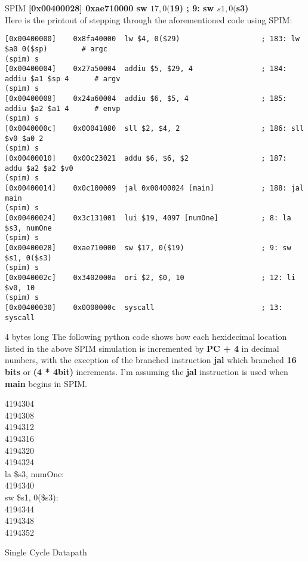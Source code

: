\documentclass[landscape,fontscale=1,margin=0.2cm,paperwidth=50truecm, paperheight=34truecm,debug]{baposter}
\begin{document}
\begin{poster}
\begin{posterbox}[column=1,textborder=rounded]{SPIM}
\textbf{[0x00400028]	0xae710000  sw $17, 0($19)                  ; 9: sw $s1, 0($s3)}\\
Here is the printout of stepping through the aforementioned code using SPIM:\\
\begin{lstlisting}
[0x00400000]	0x8fa40000  lw $4, 0($29)                   ; 183: lw $a0 0($sp)		# argc
(spim) s
[0x00400004]	0x27a50004  addiu $5, $29, 4                ; 184: addiu $a1 $sp 4		# argv
(spim) s
[0x00400008]	0x24a60004  addiu $6, $5, 4                 ; 185: addiu $a2 $a1 4		# envp
(spim) s
[0x0040000c]	0x00041080  sll $2, $4, 2                   ; 186: sll $v0 $a0 2
(spim) s
[0x00400010]	0x00c23021  addu $6, $6, $2                 ; 187: addu $a2 $a2 $v0
(spim) s
[0x00400014]	0x0c100009  jal 0x00400024 [main]           ; 188: jal main
(spim) s
[0x00400024]	0x3c131001  lui $19, 4097 [numOne]          ; 8: la $s3, numOne
(spim) s
[0x00400028]	0xae710000  sw $17, 0($19)                  ; 9: sw $s1, 0($s3) 
(spim) s
[0x0040002c]	0x3402000a  ori $2, $0, 10                  ; 12: li $v0, 10
(spim) s
[0x00400030]	0x0000000c  syscall                         ; 13: syscall
\end{lstlisting}
\end{posterbox}
\begin{posterbox}[column=1,below=auto]{4 bytes long}
The following python code shows how each hexidecimal location listed in the above SPIM simulation is incremented by \textbf{PC + 4} in decimal numbers, with the exception of the branched instruction \textbf{jal} which branched \textbf{16 bits} or \textbf{(4 * 4bit)} increments. I'm assuming the \textbf{jal} instruction is used when \textbf{main} begins in SPIM.  
\lstset{language=python}

4194304\\
4194308\\
4194312\\
4194316\\
4194320\\
4194324\\
la \$s3, numOne:\\
4194340\\
sw \$s1, 0(\$s3):\\
4194344\\
4194348\\
4194352\\
\end{posterbox}
\begin{posterbox}[column=2]{Single Cycle Datapath}
\begin{tikzpicture}

\end{tikzpicture}
\end{posterbox}
\end{poster}
\end{document}
